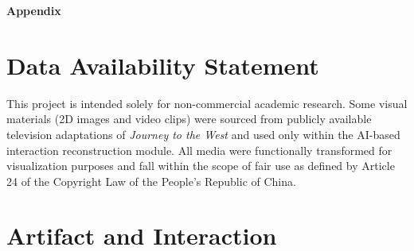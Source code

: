 \appendix
\onecolumn

\renewcommand{\thefigure}{\arabic{figure}} %
\setcounter{figure}{0}
\setcounter{table}{0}
\begin{center}
    \LARGE\textbf{Appendix}
\end{center}

\section{Data Availability Statement}
This project is intended solely for non-commercial academic research. Some visual materials (2D images and video clips) were sourced from publicly available television adaptations of \textit{Journey to the West} and used only within the AI-based interaction reconstruction module. All media were functionally transformed for visualization purposes and fall within the scope of fair use as defined by Article 24 of the Copyright Law of the People's Republic of China.
\section{Artifact and Interaction}


